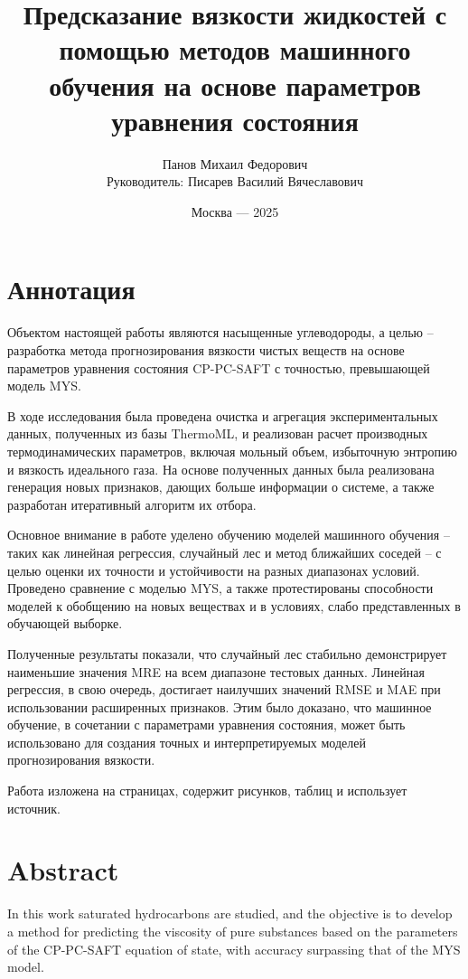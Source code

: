 \documentclass[a4paper,12pt]{article}
\title{\Huge{Предсказание вязкости жидкостей с помощью методов машинного обучения на основе параметров уравнения состояния}}
\author{Панов Михаил Федорович \\ Руководитель: Писарев Василий Вячеславович}
\date{Москва --- 2025}
\begin{document}


\section*{Аннотация}
  Объектом настоящей работы являются насыщенные углеводороды, а целью -- разработка метода прогнозирования вязкости чистых веществ на основе параметров уравнения состояния CP-PC-SAFT с точностью, превышающей модель MYS.
  
  В ходе исследования была проведена очистка и агрегация экспериментальных данных, полученных из базы ThermoML, и реализован расчет производных термодинамических параметров, включая мольный объем, избыточную энтропию и вязкость идеального газа. На основе полученных данных была реализована генерация новых признаков, дающих больше информации о системе, а также разработан итеративный алгоритм их отбора.
  
  Основное внимание в работе уделено обучению моделей машинного обучения -- таких как линейная регрессия, случайный лес и метод ближайших соседей -- с целью оценки их точности и устойчивости на разных диапазонах условий. Проведено сравнение с моделью MYS, а также протестированы способности моделей к обобщению на новых веществах и в условиях, слабо представленных в обучающей выборке.
  
  Полученные результаты показали, что случайный лес стабильно демонстрирует наименьшие значения MRE на всем диапазоне тестовых данных. Линейная регрессия, в свою очередь, достигает наилучших значений RMSE и MAE при использовании расширенных признаков. Этим было доказано, что машинное обучение, в сочетании с параметрами уравнения состояния, может быть использовано для создания точных и интерпретируемых моделей прогнозирования вязкости.
  
  Работа изложена на \pageref{LastPage} страницах, содержит  рисунков,  таблиц и использует  источник.

\section*{Abstract}
  In this work saturated hydrocarbons are studied, and the objective is to develop a method for predicting the viscosity of pure substances based on the parameters of the CP-PC-SAFT equation of state, with accuracy surpassing that of the MYS model.
\end{document}
